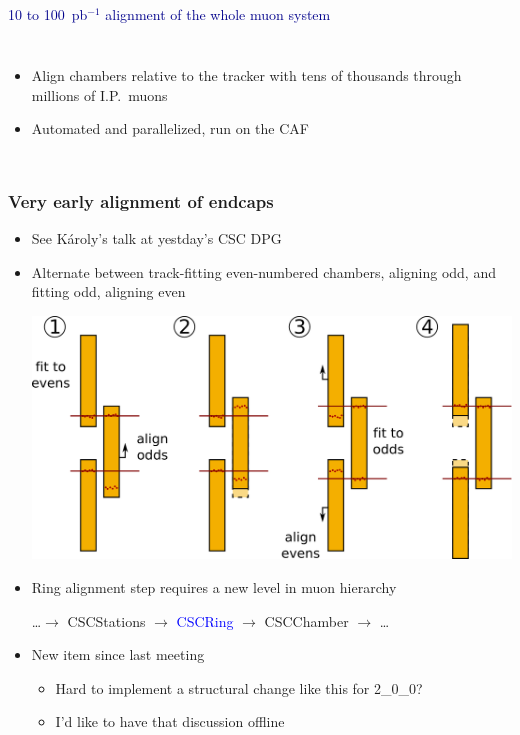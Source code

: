\documentclass[compress]{beamer}
\begin{document}
\begin{frame}
\begin{columns}
\vspace{1 cm}
\mbox{ }
\end{columns}

\vfill
\hspace{-0.83 cm} \textcolor{darkblue}{10 to 100~pb$^{-1}$ alignment of the whole muon system}

\begin{columns}
\column{\linewidth}
\begin{itemize}\setlength{\itemsep}{0.25 cm}
\item Align chambers relative to the tracker with tens of thousands
through millions of I.P.\ muons
\item Automated and parallelized, run on the CAF
\end{itemize}
\column{0 cm}
\end{columns}

\end{frame}

\begin{frame}
\frametitle{Very early alignment of endcaps}
\begin{itemize}
\item See K\'aroly's talk at yestday's CSC DPG
\item Alternate between track-fitting even-numbered chambers, aligning odd, and fitting odd, aligning even
\begin{center}\includegraphics[width=0.65\linewidth]{beamhalo.png}\end{center}

\vfill
\item Ring alignment step requires a new level in muon hierarchy
\begin{center}\ldots $\to$ CSCStations $\to$ \textcolor{blue}{CSCRing} $\to$ CSCChamber $\to$ \ldots\end{center}

\item New item since last meeting
\begin{itemize}
\item Hard to implement a structural change like this for 2\_0\_0?
\item I'd like to have that discussion offline
\end{itemize}
\end{itemize}
\end{frame}
\end{document}
